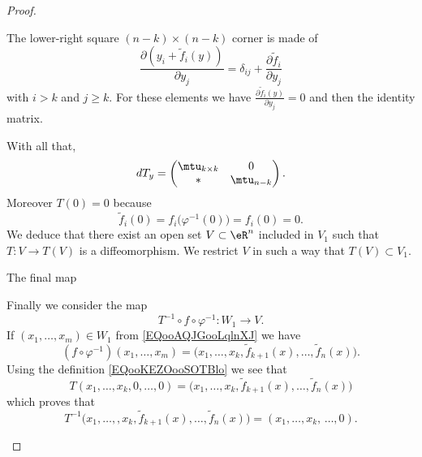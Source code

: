 \begin{proof}
\begin{subproof}
\begin{subproof}
\begin{itemize}
                    The lower-right square \( (n-k)\times (n-k)\) corner is made of
                    \begin{equation}
                        \frac{ \partial (y_i+\tilde f_i(y)) }{ \partial y_j }=\delta_{ij}+\frac{ \partial \tilde f_i }{ \partial y_j }
                    \end{equation}
                    with \( i>k\) and \( j\geq k\). For these elements we have \( \frac{ \partial \tilde f_i(y) }{ \partial y_j }=0\) and then the identity matrix.
                    \end{itemize}
                    With all that,
                    \begin{equation}
                        dT_y=\begin{pmatrix}
                            \mtu_{k\times k}    &   0    \\ 
                            *    &   \mtu_{n-k}    
                        \end{pmatrix}.
                    \end{equation}
                    Moreover \( T(0)=0\) because
                    \begin{equation}
                        \tilde f_i(0)=f_i\big( \varphi^{-1}(0) \big)=f_i(0)=0.
                    \end{equation}
                    We deduce that there exist an open set \( V\subset \eR^n\) included in \( V_1\) such that \( T\colon V\to T(V)\) is a diffeomorphism. We restrict \( V\) in such a way that \( T(V)\subset V_1\).

                \item[The final map]

                    Finally we consider the map
                    \begin{equation}
                        T^{-1}\circ f\circ \varphi^{-1}\colon W_1 \to V.
                    \end{equation}
                    If \( (x_1,\ldots, x_m)\in W_1\) from \eqref{EQooAQJGooLqlnXJ} we have
                    \begin{equation}
                        (f\circ \varphi^{-1})(x_1,\ldots, x_m)=\big( x_1,\ldots, x_k,\tilde f_{k+1}(x),\ldots, \tilde f_n(x) \big).
                    \end{equation}
                    Using the definition \eqref{EQooKEZOooSOTBlo} we see that
                    \begin{equation}
                        T(x_1,\ldots, x_k,0,\ldots, 0)=\big( x_1,\ldots, x_k,\tilde f_{k+1}(x),\ldots, \tilde f_n(x) \big)
                    \end{equation}
                    which proves that
                    \begin{equation}
                        T^{-1}\big( x_1,\ldots, ,x_k,\tilde f_{k+1}(x),\ldots, \tilde f_n(x) \big)=(x_1,\ldots, x_k,\,\ldots, 0).
                    \end{equation}
            \end{subproof}


\end{subproof}
\end{proof}
